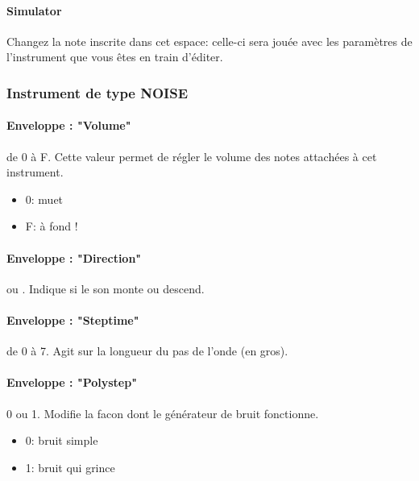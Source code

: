 \documentclass[12pt,a4paper]{article}
\begin{document}
    \paragraph{Simulator} Changez la note inscrite dans cet espace:
        celle-ci sera jouée avec les paramètres de l'instrument que vous êtes en train d'éditer.

    \subsubsection{Instrument de type NOISE}


    \paragraph{Enveloppe : "Volume"} de 0 à F.
    Cette valeur permet de régler le volume des notes attachées à cet instrument.
    \medskip

    \begin{itemize}
        \item{0: muet}
        \item{F: à fond !}
    \end{itemize}

    \paragraph{Enveloppe : "Direction"}  ou .
        Indique si le son monte ou descend.

    \paragraph{Enveloppe : "Steptime"} de 0 à 7.
    Agit sur la longueur du pas de l'onde (en gros).

    \paragraph{Enveloppe : "Polystep"} 0 ou 1.
    Modifie la facon dont le générateur de bruit fonctionne.
    \medskip

    \begin{itemize}
        \item{0: bruit simple}
        \item{1: bruit qui grince}
    \end{itemize}
\end{document}
